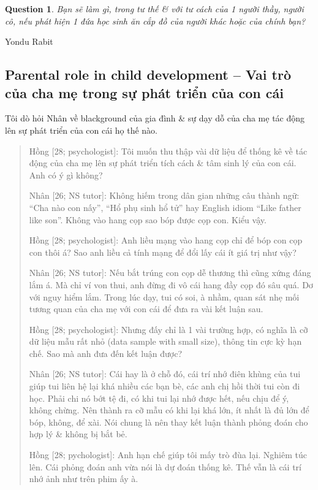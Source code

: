 \documentclass[12pt]{article}
\newtheorem{question}{Question}
\begin{document}
\begin{question}
	Bạn sẽ làm gì, trong tư thế \& với tư cách của 1 người thầy, người cô, nếu phát hiện 1 đứa học sinh ăn cắp đồ của người khác hoặc của chính bạn?
\end{question}

Yondu Rabit

\subsection{Parental role in child development -- Vai trò của cha mẹ trong sự phát triển của con cái}
Tôi dò hỏi Nhân về blackground của gia đình \& sự dạy dỗ của cha mẹ tác động lên sự phát triển của con cái họ thế nào.
\begin{quote}
	{\sf Hồng [28; psychologist]}: Tôi muốn thu thập vài dữ liệu để thống kê về tác động của cha mẹ lên sự phát triển tích cách \& tâm sinh lý của con cái. Anh có ý gì không?

	{\sf Nhân [26; NS tutor]}: Không hiếm trong dân gian những câu thành ngữ: ``Cha nào con nấy'', ``Hổ phụ sinh hổ tử'' hay English idiom ``Like father like son''. Không vào hang cọp sao bóp được cọp con. Kiểu vậy.
	
	{\sf Hồng [28; psychologist]}: Anh liều mạng vào hang cọp chỉ để bóp con cọp con thôi á? Sao anh liều cả tính mạng để đổi lấy cái ít giá trị như vậy?
	
	{\sf Nhân [26; NS tutor]}: Nếu bắt trúng con cọp dễ thương thì cũng xứng đáng lắm á. Mà chỉ ví von thui, anh đừng đi vô cái hang đầy cọp đó sâu quá. Dơ với nguy hiểm lắm. Trong lúc dạy, tui có soi, à nhầm, quan sát nhẹ mối tương quan của cha mẹ với con cái để đưa ra vài kết luận sau.
	
	{\sf Hồng [28; psychologist]}: Nhưng đấy chỉ là 1 vài trường hợp, có nghĩa là cỡ dữ liệu mẫu rất nhỏ (data sample with small size), thông tin cực kỳ hạn chế. Sao mà anh đưa đến kết luận được?
	
	{\sf Nhân [26; NS tutor]}: Cái hay là ở chỗ đó, cái trí nhớ điên khùng của tui giúp tui liên hệ lại khá nhiều các bạn bè, các anh chị hồi thời tui còn đi học. Phải chi nó bớt tệ đi, có khi tui lại nhớ được hết, nếu chịu để ý, không chừng. Nên thành ra cỡ mẫu có khi lại khá lớn, ít nhất là đủ lớn để bóp, không, để xài. Nói chung là nên thay kết luận thành phỏng đoán cho hợp lý \& không bị bắt bẻ.
	
	{\sf Hồng [28; pychologist]}: Anh hạn chế giúp tôi mấy trò đùa lại. Nghiêm túc lên. Cái phỏng đoán anh vừa nói là dự đoán thống kê. Thế vẫn là cái trí nhớ ảnh như trên phim ấy à.
	

\end{quote}
\end{document}
